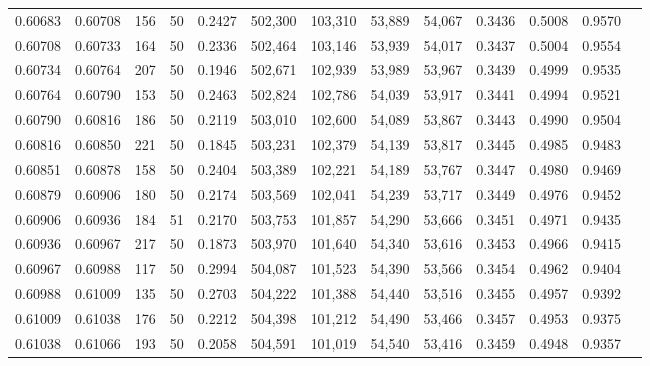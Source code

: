\begin{tabular}{rrrrrrrrrrrrr}
0.60683 & 0.60708 &   156 &  50 &                                     0.2427 & 502,300 & 103,310 &  53,889 &  54,067 & 0.3436 & 0.5008 & 0.9570 \\
0.60708 & 0.60733 &   164 &  50 &                                     0.2336 & 502,464 & 103,146 &  53,939 &  54,017 & 0.3437 & 0.5004 & 0.9554 \\
0.60734 & 0.60764 &   207 &  50 &                                     0.1946 & 502,671 & 102,939 &  53,989 &  53,967 & 0.3439 & 0.4999 & 0.9535 \\
0.60764 & 0.60790 &   153 &  50 &                                     0.2463 & 502,824 & 102,786 &  54,039 &  53,917 & 0.3441 & 0.4994 & 0.9521 \\
0.60790 & 0.60816 &   186 &  50 &                                     0.2119 & 503,010 & 102,600 &  54,089 &  53,867 & 0.3443 & 0.4990 & 0.9504 \\
0.60816 & 0.60850 &   221 &  50 &                                     0.1845 & 503,231 & 102,379 &  54,139 &  53,817 & 0.3445 & 0.4985 & 0.9483 \\
0.60851 & 0.60878 &   158 &  50 &                                     0.2404 & 503,389 & 102,221 &  54,189 &  53,767 & 0.3447 & 0.4980 & 0.9469 \\
0.60879 & 0.60906 &   180 &  50 &                                     0.2174 & 503,569 & 102,041 &  54,239 &  53,717 & 0.3449 & 0.4976 & 0.9452 \\
0.60906 & 0.60936 &   184 &  51 &                                     0.2170 & 503,753 & 101,857 &  54,290 &  53,666 & 0.3451 & 0.4971 & 0.9435 \\
0.60936 & 0.60967 &   217 &  50 &                                     0.1873 & 503,970 & 101,640 &  54,340 &  53,616 & 0.3453 & 0.4966 & 0.9415 \\
0.60967 & 0.60988 &   117 &  50 &                                     0.2994 & 504,087 & 101,523 &  54,390 &  53,566 & 0.3454 & 0.4962 & 0.9404 \\
0.60988 & 0.61009 &   135 &  50 &                                     0.2703 & 504,222 & 101,388 &  54,440 &  53,516 & 0.3455 & 0.4957 & 0.9392 \\
0.61009 & 0.61038 &   176 &  50 &                                     0.2212 & 504,398 & 101,212 &  54,490 &  53,466 & 0.3457 & 0.4953 & 0.9375 \\
0.61038 & 0.61066 &   193 &  50 &                                     0.2058 & 504,591 & 101,019 &  54,540 &  53,416 & 0.3459 & 0.4948 & 0.9357 \\

\end{tabular}
